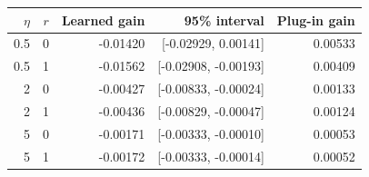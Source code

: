 \begin{tabular}{rrrrr}
\toprule
$\eta$ & $r$ & Learned gain & 95\% interval & Plug-in gain \\
\midrule
0.5 & 0 & -0.01420 & [-0.02929, 0.00141] & 0.00533 \\
0.5 & 1 & -0.01562 & [-0.02908, -0.00193] & 0.00409 \\
2 & 0 & -0.00427 & [-0.00833, -0.00024] & 0.00133 \\
2 & 1 & -0.00436 & [-0.00829, -0.00047] & 0.00124 \\
5 & 0 & -0.00171 & [-0.00333, -0.00010] & 0.00053 \\
5 & 1 & -0.00172 & [-0.00333, -0.00014] & 0.00052 \\
\bottomrule
\end{tabular}
